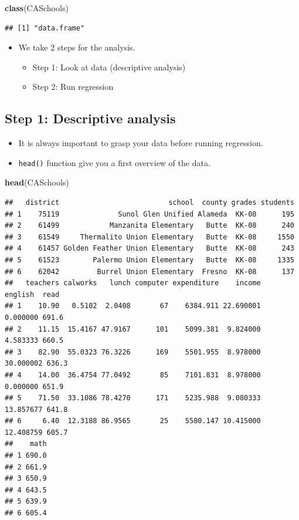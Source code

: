 \documentclass[]{book}
\newenvironment{Shaded}{\begin{snugshade}}{\end{snugshade}}
\newcommand{\KeywordTok}[1]{\textcolor[rgb]{0.13,0.29,0.53}{\textbf{#1}}}
\newcommand{\NormalTok}[1]{#1}
\providecommand{\tightlist}{%
  \setlength{\itemsep}{0pt}\setlength{\parskip}{0pt}}
\begin{document}
\begin{Shaded}
\begin{Highlighting}[]
\KeywordTok{class}\NormalTok{(CASchools)}
\end{Highlighting}
\end{Shaded}

\begin{verbatim}
## [1] "data.frame"
\end{verbatim}

\begin{itemize}
\tightlist
\item
  We take 2 steps for the analysis.

  \begin{itemize}
  \tightlist
  \item
    Step 1: Look at data (descriptive analysis)
  \item
    Step 2: Run regression
  \end{itemize}
\end{itemize}

\subsection{Step 1: Descriptive
analysis}\label{step-1-descriptive-analysis}

\begin{itemize}
\tightlist
\item
  It is always important to grasp your data before running regression.
\item
  \texttt{head()} function give you a first overview of the data.
\end{itemize}

\begin{Shaded}
\begin{Highlighting}[]
\KeywordTok{head}\NormalTok{(CASchools)}
\end{Highlighting}
\end{Shaded}

\begin{verbatim}
##   district                          school  county grades students
## 1    75119              Sunol Glen Unified Alameda  KK-08      195
## 2    61499            Manzanita Elementary   Butte  KK-08      240
## 3    61549     Thermalito Union Elementary   Butte  KK-08     1550
## 4    61457 Golden Feather Union Elementary   Butte  KK-08      243
## 5    61523        Palermo Union Elementary   Butte  KK-08     1335
## 6    62042         Burrel Union Elementary  Fresno  KK-08      137
##   teachers calworks   lunch computer expenditure    income   english  read
## 1    10.90   0.5102  2.0408       67    6384.911 22.690001  0.000000 691.6
## 2    11.15  15.4167 47.9167      101    5099.381  9.824000  4.583333 660.5
## 3    82.90  55.0323 76.3226      169    5501.955  8.978000 30.000002 636.3
## 4    14.00  36.4754 77.0492       85    7101.831  8.978000  0.000000 651.9
## 5    71.50  33.1086 78.4270      171    5235.988  9.080333 13.857677 641.8
## 6     6.40  12.3188 86.9565       25    5580.147 10.415000 12.408759 605.7
##    math
## 1 690.0
## 2 661.9
## 3 650.9
## 4 643.5
## 5 639.9
## 6 605.4
\end{verbatim}
\end{document}
